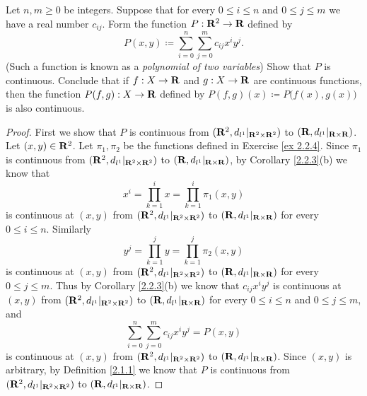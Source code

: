 \begin{exercise}\label{ex 2.2.5}
    Let \(n, m \geq 0\) be integers.
    Suppose that for every \(0 \leq i \leq n\) and \(0 \leq j \leq m\) we have a real number \(c_{ij}\).
    Form the function \(P : \mathbf{R}^2 \to \mathbf{R}\) defined by
    \[
        P(x, y) \coloneqq \sum_{i = 0}^n \sum_{j = 0}^m c_{ij} x^i y^j.
    \]
    (Such a function is known as a \emph{polynomial of two variables})
    Show that \(P\) is continuous.
    Conclude that if \(f : X \to \mathbf{R}\) and \(g : X \to \mathbf{R}\) are continuous functions, then the function \(P(f, g) : X \to \mathbf{R}\) defined by \(P(f, g)(x) \coloneqq P\big(f(x), g(x)\big)\) is also continuous.
\end{exercise}

\begin{proof}
    First we show that \(P\) is continuous from \((\mathbf{R}^2, d_{l^1}|_{\mathbf{R}^2 \times \mathbf{R}^2})\) to \((\mathbf{R}, d_{l^1}|_{\mathbf{R} \times \mathbf{R}})\).
    Let \((x, y) \in \mathbf{R}^2\).
    Let \(\pi_1, \pi_2\) be the functions defined in Exercise \ref{ex 2.2.4}.
    Since \(\pi_1\) is continuous from \((\mathbf{R}^2, d_{l^1}|_{\mathbf{R}^2 \times \mathbf{R}^2})\) to \((\mathbf{R}, d_{l^1}|_{\mathbf{R} \times \mathbf{R}})\), by Corollary \ref{2.2.3}(b) we know that
    \[
        x^i = \prod_{k = 1}^i x = \prod_{k = 1}^i \pi_1(x, y)
    \]
    is continuous at \((x, y)\) from \((\mathbf{R}^2, d_{l^1}|_{\mathbf{R}^2 \times \mathbf{R}^2})\) to \((\mathbf{R}, d_{l^1}|_{\mathbf{R} \times \mathbf{R}})\) for every \(0 \leq i \leq n\).
    Similarly
    \[
        y^j = \prod_{k = 1}^j y = \prod_{k = 1}^j \pi_2(x, y)
    \]
    is continuous at \((x, y)\) from \((\mathbf{R}^2, d_{l^1}|_{\mathbf{R}^2 \times \mathbf{R}^2})\) to \((\mathbf{R}, d_{l^1}|_{\mathbf{R} \times \mathbf{R}})\) for every \(0 \leq j \leq m\).
    Thus by Corollary \ref{2.2.3}(b) we know that \(c_{ij} x^i y^j\) is continuous at \((x, y)\) from \((\mathbf{R}^2, d_{l^1}|_{\mathbf{R}^2 \times \mathbf{R}^2})\) to \((\mathbf{R}, d_{l^1}|_{\mathbf{R} \times \mathbf{R}})\) for every \(0 \leq i \leq n\) and \(0 \leq j \leq m\), and
    \[
        \sum_{i = 0}^n \sum_{j = 0}^m c_{ij} x^i y^j = P(x, y)
    \]
    is continuous at \((x, y)\) from \((\mathbf{R}^2, d_{l^1}|_{\mathbf{R}^2 \times \mathbf{R}^2})\) to \((\mathbf{R}, d_{l^1}|_{\mathbf{R} \times \mathbf{R}})\).
    Since \((x, y)\) is arbitrary, by Definition \ref{2.1.1} we know that \(P\) is continuous from \((\mathbf{R}^2, d_{l^1}|_{\mathbf{R}^2 \times \mathbf{R}^2})\) to \((\mathbf{R}, d_{l^1}|_{\mathbf{R} \times \mathbf{R}})\).


\end{proof}

